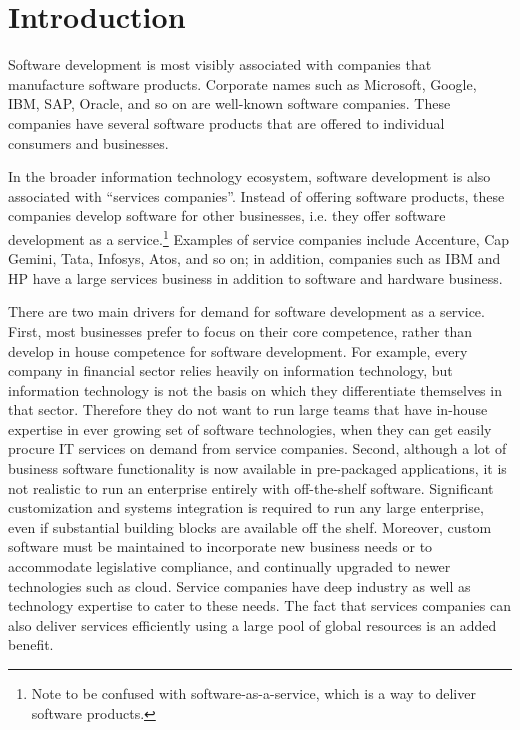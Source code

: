 \section{Introduction}

Software development is most visibly associated with companies that manufacture software products.  Corporate names such as Microsoft, Google, IBM, SAP, Oracle, and so on are well-known software companies.  These companies have several software  products that are offered to individual consumers and businesses.

In the broader information technology ecosystem, software development is also associated with ``services companies''.  Instead of offering software products, these companies develop software for other businesses, i.e. they offer software development as a service.\footnote{Note to be confused with software-as-a-service, which is a way to deliver software products.} Examples of service companies include Accenture, Cap Gemini, Tata, Infosys, Atos, and so on; in addition, companies such as IBM and HP have a large services business in addition to software and hardware business.

There are two main drivers for demand for software development as a service.  First, most businesses prefer to focus on their core competence, rather than develop in house competence for software development.  For example, every company in financial sector relies heavily on information technology, but information technology is not the basis on which they differentiate themselves in that sector. Therefore they do not want to run large teams that have in-house expertise in ever growing set of software technologies, when they can get easily procure IT services on demand from service companies. Second, although a lot of business software functionality is now available in pre-packaged applications, it is not realistic to run an enterprise entirely with off-the-shelf software. Significant customization and systems integration is required to run any large enterprise, even if substantial building blocks are available off the shelf. Moreover, custom software must be maintained to incorporate new business needs or to accommodate legislative compliance, and continually upgraded to newer technologies such as cloud. Service companies have deep industry as well as technology expertise to cater to these needs. The fact that services companies can also deliver services efficiently using a large pool of global resources is an added benefit. 

